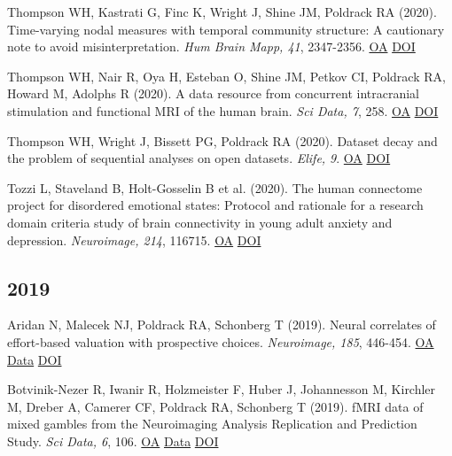 \documentclass[10pt, letterpaper]{article}
\begin{document}
Thompson WH, Kastrati G, Finc K, Wright J, Shine JM, Poldrack RA (2020). Time-varying nodal measures with temporal community structure: A cautionary note to avoid misinterpretation. \textit{Hum Brain Mapp, 41}, 2347-2356. \href{https://www.ncbi.nlm.nih.gov/pmc/articles/PMC7268033}{OA} \href{http://dx.doi.org/10.1002/hbm.24950}{DOI} \vspace{2mm}

Thompson WH, Nair R, Oya H, Esteban O, Shine JM, Petkov CI, Poldrack RA, Howard M, Adolphs R (2020). A data resource from concurrent intracranial stimulation and functional MRI of the human brain. \textit{Sci Data, 7}, 258. \href{https://www.ncbi.nlm.nih.gov/pmc/articles/PMC7406507}{OA} \href{http://dx.doi.org/10.1038/s41597-020-00595-y}{DOI} \vspace{2mm}

Thompson WH, Wright J, Bissett PG, Poldrack RA (2020). Dataset decay and the problem of sequential analyses on open datasets. \textit{Elife, 9}. \href{https://www.ncbi.nlm.nih.gov/pmc/articles/PMC7237204}{OA} \href{http://dx.doi.org/10.7554/elife.53498}{DOI} \vspace{2mm}

Tozzi L, Staveland B, Holt-Gosselin B et al. (2020). The human connectome project for disordered emotional states: Protocol and rationale for a research domain criteria study of brain connectivity in young adult anxiety and depression. \textit{Neuroimage, 214}, 116715. \href{https://www.ncbi.nlm.nih.gov/pmc/articles/PMC8597395}{OA} \href{http://dx.doi.org/10.1016/j.neuroimage.2020.116715}{DOI} \vspace{2mm}

\subsection*{2019}Aridan N, Malecek NJ, Poldrack RA, Schonberg T (2019). Neural correlates of effort-based valuation with prospective choices. \textit{Neuroimage, 185}, 446-454. \href{https://www.ncbi.nlm.nih.gov/pmc/articles/PMC6289638}{OA} \href{https://openneuro.org/datasets/ds001167/versions/00002}{Data} \href{http://dx.doi.org/10.1016/j.neuroimage.2018.10.051}{DOI} \vspace{2mm}

Botvinik-Nezer R, Iwanir R, Holzmeister F, Huber J, Johannesson M, Kirchler M, Dreber A, Camerer CF, Poldrack RA, Schonberg T (2019). fMRI data of mixed gambles from the Neuroimaging Analysis Replication and Prediction Study. \textit{Sci Data, 6}, 106. \href{https://www.ncbi.nlm.nih.gov/pmc/articles/PMC6602933}{OA} \href{https://openneuro.org/datasets/ds001734/versions/1.0.5}{Data} \href{http://dx.doi.org/10.1038/s41597-019-0113-7}{DOI} \vspace{2mm}
\end{document}
